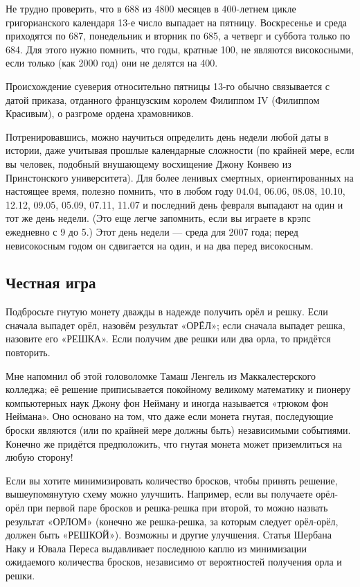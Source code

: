 Не трудно проверить, что в 688 из 4800 месяцев в 400-летнем цикле григорианского календаря 13-е число выпадает на пятницу.
Воскресенье и среда приходятся по 687, понедельник и вторник по 685, а четверг и суббота только по 684.
Для этого нужно помнить, что годы, кратные 100, не являются високосными, если только (как 2000 год) они не делятся на 400.

Происхождение суеверия относительно пятницы 13-го обычно связывается с датой приказа, отданного французским королем Филиппом IV (Филиппом Красивым), о разгроме ордена храмовников.

Потренировавшись, можно научиться определить день недели любой даты в истории, даже учитывая прошлые календарные сложности
(по крайней мере, если вы человек, подобный внушающему восхищение Джону Конвею из Принстонского университета).
Для более ленивых смертных, ориентированных на настоящее время, полезно помнить, что в любом году
04.04, 06.06, 08.08, 10.10, 12.12, 09.05, 05.09, 07.11, 11.07 и последний день февраля выпадают на один и тот же день недели.
(Это еще легче запомнить, если вы играете в крэпс ежедневно с 9 до 5.)
Этот день недели --- среда для 2007 года;
перед невисокосным годом он сдвигается на один, и на два перед високосным.

\subsection*{Честная игра}

Подбросьте гнутую монету дважды в надежде получить орёл и решку.
Если сначала выпадет орёл, назовём результат «ОРЁЛ»;
если сначала выпадет решка, назовите его «РЕШКА».
Если получим две решки или два орла, то придётся повторить.

Мне напомнил об этой головоломке Тамаш Ленгель из Маккалестерского колледжа;
её решение приписывается покойному великому математику и пионеру компьютерных наук Джону фон Нейману и иногда называется «трюком фон Неймана».
Оно основано на том, что даже если монета гнутая, последующие броски являются (или по крайней мере должны быть) независимыми событиями.
Конечно же придётся предположить, что гнутая монета может приземлиться на любую сторону!

Если вы хотите минимизировать количество бросков, чтобы принять решение, вышеупомянутую схему можно улучшить. Например, если вы получаете орёл-орёл при первой паре бросков и решка-решка при второй, то можно назвать результат «ОРЛОМ» (конечно же решка-решка, за которым следует орёл-орёл, должен быть «РЕШКОЙ»).
Возможны и другие улучшения.
Статья Шербана Наку и Ювала Переса \cite{nacu-peres} выдавливает последнюю каплю из минимизации ожидаемого количества бросков, независимо от вероятностей получения орла и решки.

